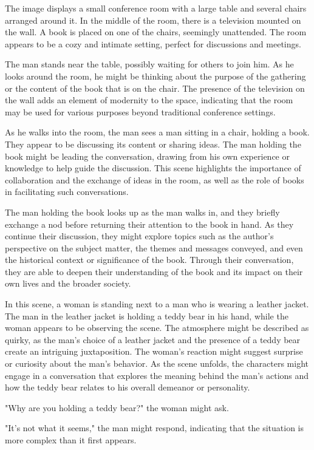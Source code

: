 \documentclass[smalldemyvopaper,11pt,twoside,onecolumn,openright,extrafontsizes]{memoir}
\begin{document}
The image displays a small conference room with a large table and several chairs arranged around it. In the middle of the room, there is a television mounted on the wall. A book is placed on one of the chairs, seemingly unattended. The room appears to be a cozy and intimate setting, perfect for discussions and meetings.\par
The man stands near the table, possibly waiting for others to join him. As he looks around the room, he might be thinking about the purpose of the gathering or the content of the book that is on the chair. The presence of the television on the wall adds an element of modernity to the space, indicating that the room may be used for various purposes beyond traditional conference settings.\par
As he walks into the room, the man sees a man sitting in a chair, holding a book. They appear to be discussing its content or sharing ideas. The man holding the book might be leading the conversation, drawing from his own experience or knowledge to help guide the discussion. This scene highlights the importance of collaboration and the exchange of ideas in the room, as well as the role of books in facilitating such conversations.\par
The man holding the book looks up as the man walks in, and they briefly exchange a nod before returning their attention to the book in hand. As they continue their discussion, they might explore topics such as the author's perspective on the subject matter, the themes and messages conveyed, and even the historical context or significance of the book. Through their conversation, they are able to deepen their understanding of the book and its impact on their own lives and the broader society.\par
In this scene, a woman is standing next to a man who is wearing a leather jacket. The man in the leather jacket is holding a teddy bear in his hand, while the woman appears to be observing the scene. The atmosphere might be described as quirky, as the man's choice of a leather jacket and the presence of a teddy bear create an intriguing juxtaposition. The woman's reaction might suggest surprise or curiosity about the man's behavior. As the scene unfolds, the characters might engage in a conversation that explores the meaning behind the man's actions and how the teddy bear relates to his overall demeanor or personality.\par
"Why are you holding a teddy bear?" the woman might ask.\par
"It's not what it seems," the man might respond, indicating that the situation is more complex than it first appears.\par
\end{document}
